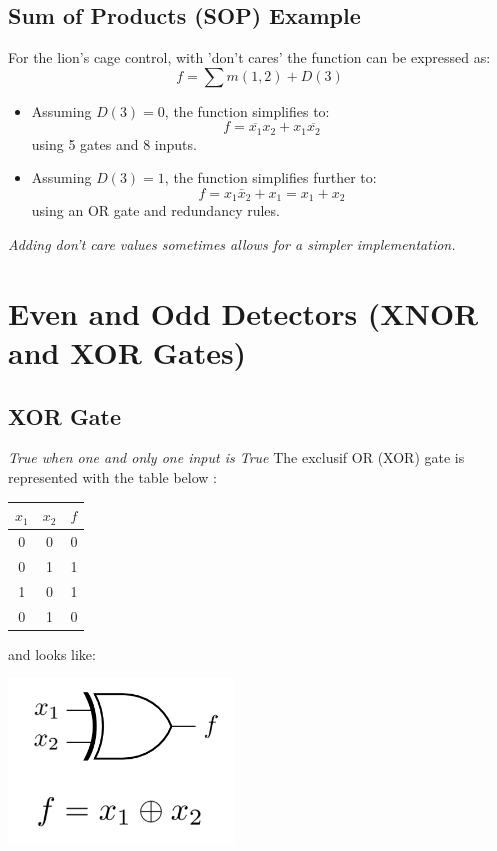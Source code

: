 \documentclass[12pt,openany, tikz,border=10pt]{book}
\begin{document}
\subsection{Sum of Products (SOP) Example}
For the lion's cage control, with 'don't cares' the function can be expressed as:
\[ f = \sum m(1,2) + D(3) \]

\begin{itemize}
    \item Assuming \( D(3) = 0 \), the function simplifies to:
    \[ f = \overline{x_1} x_2 + x_1 \overline{x_2} \]
    using 5 gates and 8 inputs.
    \item Assuming \( D(3) = 1 \), the function simplifies further to:
    \[ f = x_1 \bar{x}_2 + x_1 = x_1 + x_2 \]
    using an OR gate and redundancy rules.
\end{itemize}

\textit{Adding don't care values sometimes allows for a simpler implementation.}
\section{Even and Odd Detectors (XNOR and XOR Gates)}
\subsection{XOR Gate}
\textit{True when one and only one input is True}
The exclusif OR (XOR) gate is represented with the table below :
\begin{table}[h]
    \centering
    \begin{tabular}{|c|c|c|}
    \hline
    \( x_1 \) & \( x_2 \) & \( f \) \\
    \hline
    0 & 0 & 0 \\
    0 & 1 & 1 \\
    1 & 0 & 1 \\
    0 & 1 & 0 \\
    \hline
    \end{tabular}
    \end{table}

and looks like:
\vspace*{-10px}
\begin{center}
    \begin{minipage}[c]{0.45\textwidth} %
        \centering
        \includegraphics[width=0.45\textwidth]{circuits/6.11.1.png} %
    \end{minipage}
\end{center}
\end{document}
